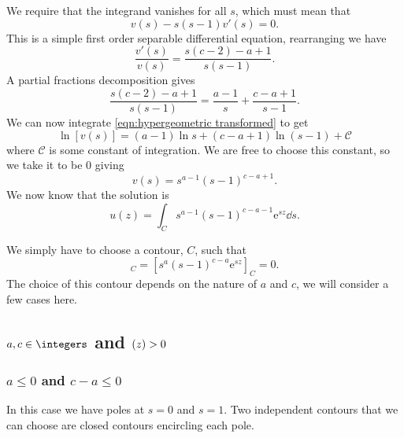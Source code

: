 \documentclass[fleqn]{NotesClass}
\newcommand*{\e}{\mathrm{e}}
\let\Re\relax
\DeclareMathOperator{\Re}{Re}
\begin{document}
    We require that the integrand vanishes for all \(s\), which must mean that
    \begin{equation}
        [s(c - 2) - a + 1]v(s) - s(s - 1)v'(s) = 0.
    \end{equation}
    This is a simple first order separable differential equation, rearranging we have
    \begin{equation}\label{eqn:hypergeometric transformed}
        \frac{v'(s)}{v(s)} = \frac{s(c - 2) - a + 1}{s(s - 1)}.
    \end{equation}
    A partial fractions decomposition gives
    \begin{equation}
        \frac{s(c - 2) - a + 1}{s(s - 1)} = \frac{a - 1}{s} + \frac{c - a + 1}{s - 1}.
    \end{equation}
    We can now integrate \cref{eqn:hypergeometric transformed} to get
    \begin{equation}
        \ln[v(s)] = (a - 1)\ln s + (c - a + 1)\ln(s - 1) + \mathcal{C}
    \end{equation}
    where \(\mathcal{C}\) is some constant of integration.
    We are free to choose this constant, so we take it to be 0 giving
    \begin{equation}
        v(s) = s^{a - 1}(s - 1)^{c - a + 1}.
    \end{equation}
    We now know that the solution is
    \begin{equation}
        u(z) = \int_C s^{a - 1}(s - 1)^{c - a - 1} \e^{sz} \dd{s}.
    \end{equation}

    We simply have to choose a contour, \(C\), such that
    \begin{equation}
        [s(s - 1)v(s)\e^{sz}]_C = [s^a(s - 1)^{c-a}\e^{sz}]_C = 0.
    \end{equation}
    The choice of this contour depends on the nature of \(a\) and \(c\), we will consider a few cases here.
    
    \subsection{\texorpdfstring{\(a, c \in \integers\) and \(\Re(z) > 0\)}{Integer a and c and Re(z) > 0}}
    \subsubsection{\texorpdfstring{\(a \le 0\) and \(c - a \le 0\)}{a and c - a Both Negative}}
    In this case we have poles at \(s = 0\) and \(s = 1\).
    Two independent contours that we can choose are closed contours encircling each pole.
    
\end{document}
